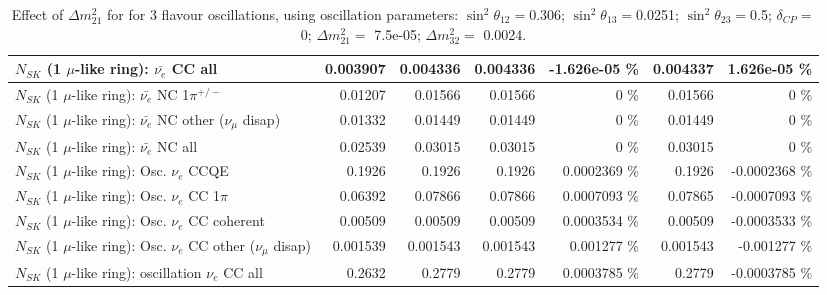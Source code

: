 \begin{table}
\begin{tabular}{| l | r | r | r  r | r  r |}
                            $N_{SK}$ (1 $\mu$-like ring): $\bar{\nu_{e}}$ CC all &        0.003907 &        0.004336 &        0.004336 & -1.626e-05 \%  &        0.004337 & 1.626e-05 \%  \\ 
\hline
                     $N_{SK}$ (1 $\mu$-like ring): $\bar{\nu_e}$ NC 1$\pi^{+/-}$ &         0.01207 &         0.01566 &         0.01566 &        0 \%  &         0.01566 &        0 \%  \\ 
          $N_{SK}$ (1 $\mu$-like ring): $\bar{\nu_e}$ NC other ($\nu_\mu$ disap) &         0.01332 &         0.01449 &         0.01449 &        0 \%  &         0.01449 &        0 \%  \\ 
                            $N_{SK}$ (1 $\mu$-like ring): $\bar{\nu_{e}}$ NC all &         0.02539 &         0.03015 &         0.03015 &        0 \%  &         0.03015 &        0 \%  \\ 
\hline
\hline
\hline
                                 $N_{SK}$ (1 $\mu$-like ring): Osc. $\nu_e$ CCQE &          0.1926 &          0.1926 &          0.1926 & 0.0002369 \%  &          0.1926 & -0.0002368 \%  \\ 
                            $N_{SK}$ (1 $\mu$-like ring): Osc. $\nu_e$ CC 1$\pi$ &         0.06392 &         0.07866 &         0.07866 & 0.0007093 \%  &         0.07865 & -0.0007093 \%  \\ 
                          $N_{SK}$ (1 $\mu$-like ring): Osc. $\nu_e$ CC coherent &         0.00509 &         0.00509 &         0.00509 & 0.0003534 \%  &         0.00509 & -0.0003533 \%  \\ 
           $N_{SK}$ (1 $\mu$-like ring): Osc. $\nu_e$ CC other ($\nu_\mu$ disap) &        0.001539 &        0.001543 &        0.001543 & 0.001277 \%  &        0.001543 & -0.001277 \%  \\ 
                        $N_{SK}$ (1 $\mu$-like ring): oscillation $\nu_e$ CC all &          0.2632 &          0.2779 &          0.2779 & 0.0003785 \%  &          0.2779 & -0.0003785 \%  \\ 
\hline
\hline
\end{tabular}
\caption{ Effect of $\Delta m^2_{21}$ for for 3 flavour oscillations, using oscillation parameters:  $\sin^2\theta_{12} = $0.306; $\sin^2\theta_{13} = $0.0251; $\sin^2\theta_{23} = $0.5; $\delta_{CP} = $        0; $\Delta m^2_{21} = $    7.5e-05; $\Delta m^2_{32} = $    0.0024. }
\label{tab:num_dm12sq_1RmuT_3f_osc_t13:0.0251}
\end{table}
\clearpage
